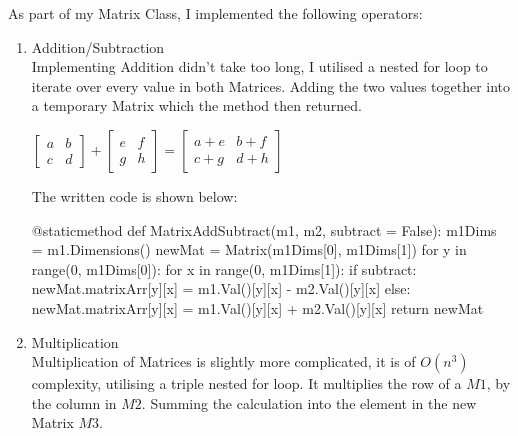\begin{flushleft}
                \vspace{0.25cm}
                As part of my Matrix Class, I implemented the following operators:
                \begin{enumerate}
                    \item Addition/Subtraction \\
                        Implementing Addition didn't take too long, I utilised a nested for loop to iterate over every value in both Matrices.
                        Adding the two values together into a temporary Matrix which the method then returned. 
                        \vspace{0.25cm}
                        \begin{center}
                            $\begin{bmatrix}
                                a & b\\
                                c & d
                            \end{bmatrix} +
                            \begin{bmatrix}
                                e & f\\
                                g & h
                            \end{bmatrix} =
                            \begin{bmatrix}
                                a+e & b+f\\
                                c+g & d+h
                            \end{bmatrix}$
                        \end{center}
                        \vspace{0.25cm}

                        The written code is shown below:
                        \begin{pythoncode}
@staticmethod
def MatrixAddSubtract(m1, m2, subtract = False):
    m1Dims = m1.Dimensions()
    newMat = Matrix(m1Dims[0], m1Dims[1])
    for y in range(0, m1Dims[0]):
        for x in range(0, m1Dims[1]):
            if subtract:
                newMat.matrixArr[y][x] = m1.Val()[y][x] - m2.Val()[y][x]
            else:
                newMat.matrixArr[y][x] = m1.Val()[y][x] + m2.Val()[y][x]
    return newMat
                        \end{pythoncode}

                    \item Multiplication \\
                        Multiplication of Matrices is slightly more complicated, it is of $O(n^3)$ complexity, utilising a triple nested for loop.
                        It multiplies the row of a $M1$, by the column in $M2$. Summing the calculation into the element in the new Matrix $M3$. \\
                        

\end{enumerate}
\end{flushleft}
